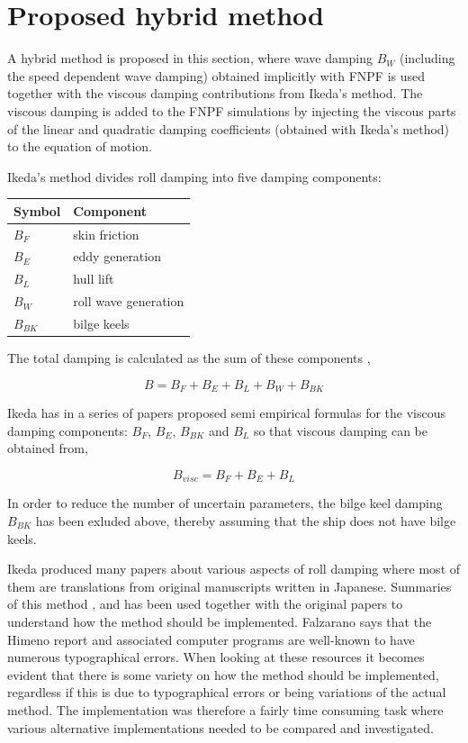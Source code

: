 \section{Proposed hybrid method}\label{proposed-hybrid-method}

A hybrid method is proposed in this section, where wave damping $B_W$
(including the speed dependent wave damping) obtained implicitly with
FNPF is used together with the viscous damping contributions from
Ikeda's method. The viscous damping is added to the FNPF simulations by
injecting the viscous parts of the linear and quadratic damping
coefficients (obtained with Ikeda's method) to the equation of motion.

Ikeda's method divides roll damping into five damping components:

\begin{longtable}[]{@{}ll@{}}
\toprule
Symbol & Component\tabularnewline
\midrule
\endhead
$B_F$ & skin friction\tabularnewline
$B_E$ & eddy generation\tabularnewline
$B_L$ & hull lift\tabularnewline
$B_W$ & roll wave generation\tabularnewline
$B_{BK}$ & bilge keels\tabularnewline
\bottomrule
\end{longtable}

The total damping is calculated as the sum of these components
\cite{7505983/937PN5DT},

\begin{equation}
B = B_F + B_E + B_L + B_W + B_{BK}
\end{equation}

Ikeda has in a series of papers proposed semi empirical formulas for the
viscous damping components: $B_F$, $B_E$, $B_{BK}$ and $B_L$ so
that viscous damping can be obtained from,

\begin{equation}
\label{eq:viscous damping}
B_{visc} = B_F + B_E + B_L
\end{equation}

In order to reduce the number of uncertain parameters, the bilge keel
damping $B_{BK}$ has been exluded above, thereby assuming that the
ship does not have bilge keels.

Ikeda produced many papers about various aspects of roll damping where
most of them are translations from original manuscripts written in
Japanese. Summaries of this method \cite{7505983/FB64RGPF},
\cite{7505983/KAKIM2E2} and \cite{7505983/UGK6YEVD} has been used
together with the original papers to understand how the method should be
implemented. Falzarano says that the Himeno report and associated
computer programs are well-known to have numerous typographical errors.
When looking at these resources it becomes evident that there is some
variety on how the method should be implemented, regardless if this is
due to typographical errors or being variations of the actual method.
The implementation was therefore a fairly time consuming task where
various alternative implementations needed to be compared and
investigated.

